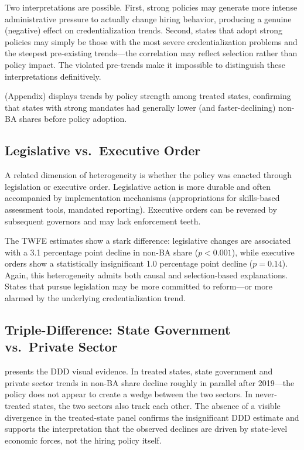 \documentclass[12pt]{article}
\begin{document}
Two interpretations are possible. First, strong policies may generate more intense administrative pressure to actually change hiring behavior, producing a genuine (negative) effect on credentialization trends. Second, states that adopt strong policies may simply be those with the most severe credentialization problems and the steepest pre-existing trends---the correlation may reflect selection rather than policy impact. The violated pre-trends make it impossible to distinguish these interpretations definitively.

 (Appendix) displays trends by policy strength among treated states, confirming that states with strong mandates had generally lower (and faster-declining) non-BA shares before policy adoption.

\subsection{Legislative vs.\ Executive Order}

A related dimension of heterogeneity is whether the policy was enacted through legislation or executive order. Legislative action is more durable and often accompanied by implementation mechanisms (appropriations for skills-based assessment tools, mandated reporting). Executive orders can be reversed by subsequent governors and may lack enforcement teeth.

The TWFE estimates show a stark difference: legislative changes are associated with a 3.1 percentage point decline in non-BA share ($p < 0.001$), while executive orders show a statistically insignificant 1.0 percentage point decline ($p = 0.14$). Again, this heterogeneity admits both causal and selection-based explanations. States that pursue legislation may be more committed to reform---or more alarmed by the underlying credentialization trend.

\subsection{Triple-Difference: State Government vs.\ Private Sector}

 presents the DDD visual evidence. In treated states, state government and private sector trends in non-BA share decline roughly in parallel after 2019---the policy does not appear to create a wedge between the two sectors. In never-treated states, the two sectors also track each other. The absence of a visible divergence in the treated-state panel confirms the insignificant DDD estimate and supports the interpretation that the observed declines are driven by state-level economic forces, not the hiring policy itself.
\end{document}
